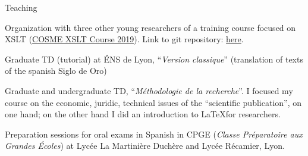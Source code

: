 \begin{rubric}{Teaching}
                                \entry*[2020-2021]
                                
                            
                    
                                \entry*
                            
                    
                                \entry*
                            
                    
                                \entry*[2019-2020]
                                
                            
                    
                                \entry*
                            
                    
                                \entry*
                            
                    
                                \entry*
                            
                    
                                \entry*[2018-2019]
                                
                            Organization with three other young researchers of
                        a training course focused on XSLT (\href{https://cosme.hypotheses.org/1117}{COSME XSLT
                            Course 2019}). Link to git repository: \href{https://github.com/gabays/Cours\_COSME\_2019}{here}.
                    
                                \entry*
                            Graduate TD (tutorial) at ÉNS de Lyon,
                                \enquote{\textit{Version classique}}
                        (translation of texts of the spanish Siglo de
                            Oro)
                    
                                \entry*
                            Graduate and undergraduate TD,
                                \enquote{\textit{Méthodologie de la
                        recherche}}. I focused my course on the
                        economic, juridic, technical issues of the
                            \enquote{scientific publication}, on one hand; on
                        the other hand I did an introduction to \LaTeX for
                        researchers.
                    
                                \entry*[2017-2018]
                                
                            Preparation sessions for oral exams in Spanish in
                        CPGE (\textit{Classe Préparatoire aux Grandes Écoles})
                        at Lycée La Martinière Duchère and Lycée Récamier,
                        Lyon.
                    \end{rubric}


